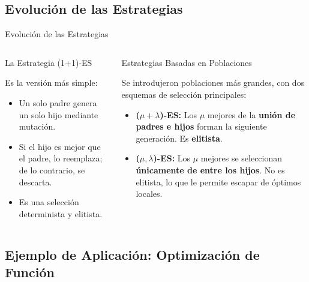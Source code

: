 \documentclass[aspectratio=169,xcolor=dvipsnames]{beamer}
\begin{document}
\subsection{Evolución de las Estrategias}

\begin{frame}{Evolución de las Estrategias}
    \begin{columns}[t]
            \begin{block}{La Estrategia (1+1)-ES}
                                \footnotesize

                Es la versión más simple:
                \begin{itemize}
                    \item Un solo padre genera un solo hijo mediante mutación.
                    \item Si el hijo es mejor que el padre, lo reemplaza; de lo contrario, se descarta.
                    \item Es una selección determinista y elitista.
                \end{itemize}
            \end{block}

            \begin{alertblock}{Estrategias Basadas en Poblaciones}
                                \footnotesize

                 Se introdujeron poblaciones más grandes, con dos esquemas de selección principales:
                 \begin{itemize}
                    \item \textbf{($\mu+\lambda$)-ES:} Los $\mu$ mejores de la \textbf{unión de padres e hijos} forman la siguiente generación. Es \textbf{elitista}.
                    \item \textbf{($\mu,\lambda$)-ES:} Los $\mu$ mejores se seleccionan \textbf{únicamente de entre los hijos}. No es elitista, lo que le permite escapar de óptimos locales.
                \end{itemize}
            \end{alertblock}
    \end{columns}
\end{frame}
\subsection{Ejemplo de Aplicación: Optimización de Función}
\end{document}
